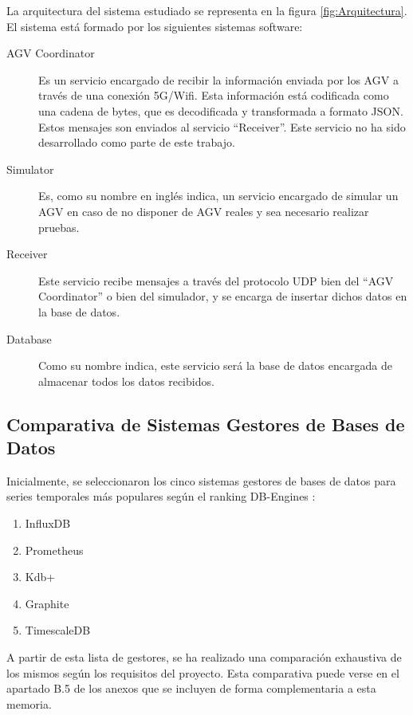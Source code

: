La arquitectura del sistema estudiado se representa en la figura \ref*{fig:Arquitectura}. El sistema
está formado por los siguientes sistemas software:
\begin{description}
    \item [AGV Coordinator] Es un servicio encargado de recibir la información enviada por los AGV a
        través de una conexión 5G/Wifi. Esta información está codificada como una cadena de bytes, que
        es decodificada y transformada a formato JSON. Estos mensajes son enviados al servicio 
        ``Receiver''. Este servicio no ha sido desarrollado como parte de este trabajo.
    \item [Simulator] Es, como su nombre en inglés indica, un servicio encargado de simular un AGV
        en caso de no disponer de AGV reales y sea necesario realizar pruebas.
    \item [Receiver] Este servicio recibe mensajes a través del protocolo UDP bien del ``AGV Coordinator''
        o bien del simulador, y se encarga de insertar dichos datos en la base de datos.
    \item [Database] Como su nombre indica, este servicio será la base de datos encargada de almacenar
        todos los datos recibidos.
\end{description}


\subsection{Comparativa de Sistemas Gestores de Bases de Datos}

Inicialmente, se seleccionaron los cinco sistemas gestores de bases de datos para series temporales más populares 
según el ranking DB-Engines \cite{dbengines:rankingTSDBMS}:
\begin{enumerate}
    \item InfluxDB
    \item Prometheus
    \item Kdb+
    \item Graphite
    \item TimescaleDB
\end{enumerate}

A partir de esta lista de gestores, se ha realizado una comparación exhaustiva de los mismos según los requisitos 
del proyecto. Esta comparativa puede verse en el apartado B.5 de los anexos que se incluyen de forma complementaria 
a esta memoria.

